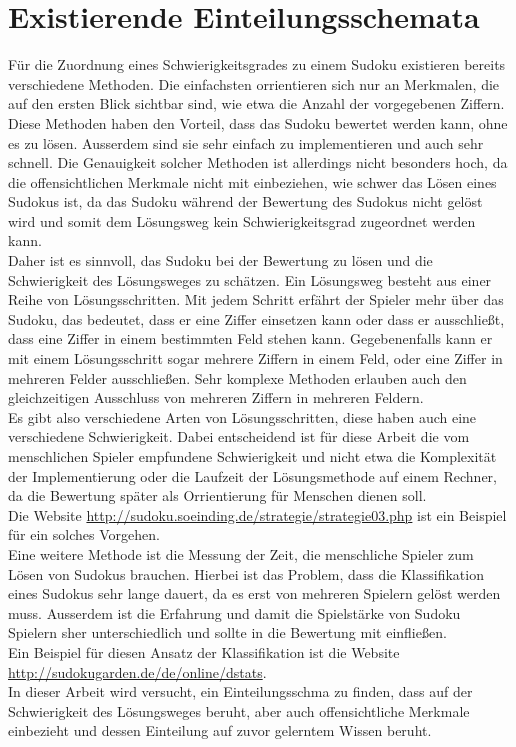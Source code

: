 \newpage
\section{Existierende Einteilungsschemata}
\label{Einteilungen}
Für die Zuordnung eines Schwierigkeitsgrades zu einem Sudoku existieren bereits verschiedene Methoden. Die einfachsten orrientieren sich nur an Merkmalen, die auf den ersten Blick sichtbar sind, wie etwa die Anzahl der vorgegebenen Ziffern. Diese Methoden haben den Vorteil, dass das Sudoku bewertet werden kann, ohne es zu lösen. Ausserdem sind sie sehr einfach zu implementieren und auch sehr schnell. Die Genauigkeit solcher Methoden ist allerdings nicht besonders hoch, da die offensichtlichen Merkmale nicht mit einbeziehen, wie schwer das Lösen eines Sudokus ist, da das Sudoku während der Bewertung des Sudokus nicht gelöst wird und somit dem Lösungsweg kein Schwierigkeitsgrad zugeordnet werden kann.\\
Daher ist es sinnvoll, das Sudoku bei der Bewertung zu lösen und die Schwierigkeit des Lösungsweges zu schätzen. Ein Lösungsweg besteht aus einer Reihe von Lösungsschritten. Mit jedem Schritt erfährt der Spieler mehr über das Sudoku, das bedeutet, dass er eine Ziffer einsetzen kann oder dass er ausschließt, dass eine Ziffer in einem bestimmten Feld stehen kann. Gegebenenfalls kann er mit einem Lösungsschritt sogar mehrere Ziffern in einem Feld, oder eine Ziffer in mehreren Felder ausschließen. Sehr komplexe Methoden erlauben auch den gleichzeitigen Ausschluss von mehreren Ziffern in mehreren Feldern.\\
Es gibt also verschiedene Arten von Lösungsschritten, diese haben auch eine verschiedene Schwierigkeit. Dabei entscheidend ist für diese Arbeit die vom menschlichen Spieler empfundene Schwierigkeit und nicht etwa die Komplexität der Implementierung oder die Laufzeit der Lösungsmethode auf einem Rechner, da die Bewertung später als Orrientierung für Menschen dienen soll.\\
Die Website \url{http://sudoku.soeinding.de/strategie/strategie03.php} ist ein Beispiel für ein solches Vorgehen.\\
Eine weitere Methode ist die Messung der Zeit, die menschliche Spieler zum Lösen von Sudokus brauchen. Hierbei ist das Problem, dass die Klassifikation eines Sudokus sehr lange dauert, da es erst von mehreren Spielern gelöst werden muss. Ausserdem ist die Erfahrung und damit die Spielstärke von Sudoku Spielern sher unterschiedlich und sollte in die Bewertung mit einfließen.\\
Ein Beispiel für diesen Ansatz der Klassifikation ist die Website \url{http://sudokugarden.de/de/online/dstats}.\\
In dieser Arbeit wird versucht, ein Einteilungsschma zu finden, dass auf der Schwierigkeit des Lösungsweges beruht, aber auch offensichtliche Merkmale einbezieht und dessen Einteilung auf zuvor gelerntem Wissen beruht.